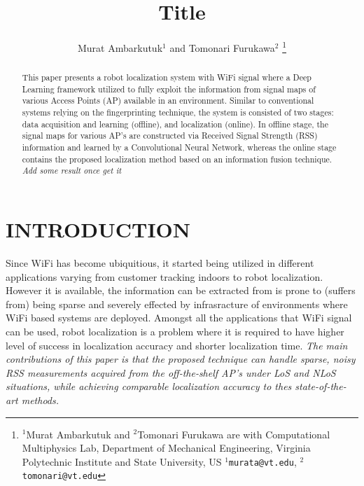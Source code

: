 \documentclass[letterpaper, 10 pt, conference]{ieeeconf}  %
\title{\LARGE \bf
Title
}
\author{Murat Ambarkutuk$^{1}$ and Tomonari Furukawa$^{2}$%
\thanks{$^{1}$Murat Ambarkutuk and $^{2}$Tomonari Furukawa are with Computational Multiphysics Lab, Department of Mechanical Engineering,
        Virginia Polytechnic Institute and State University, US
        {\tt\small $^{1}$murata@vt.edu}, {\tt\small $^{2}$tomonari@vt.edu}}%
}
\begin{document}
\maketitle
\thispagestyle{empty}
\pagestyle{empty}


\begin{abstract}

  This paper presents a robot localization system with WiFi signal where a Deep Learning framework utilized to fully exploit the information from signal maps of various Access Points (AP) available in an environment.
  Similar to conventional systems relying on the fingerprinting technique, the system is consisted of two stages: data acquisition and learning (offline), and localization (online).
  In offline stage, the signal maps for various AP's are constructed via Received Signal Strength (RSS) information and learned by a Convolutional Neural Network, whereas the online stage contains the proposed localization method based on an information fusion technique.
  \textit{Add some result once get it}
\end{abstract}


\section{INTRODUCTION}

  Since WiFi has become ubiquitious, it started being utilized in different applications varying from customer tracking indoors to robot localization. %
  However it is available, the information can be extracted from is prone to (suffers from) being sparse and severely effected by infrasracture of environments where WiFi based systems are deployed.
  Amongst all the applications that WiFi signal can be used, robot localization is a problem where it is required to have higher level of success in localization accuracy and shorter localization time.
  \textit{The main contributions of this paper is that the proposed technique can handle sparse, noisy RSS measurements acquired from the off-the-shelf AP's under LoS and NLoS situations, while achieving comparable localization accuracy to thes state-of-the-art methods.}
\end{document}

